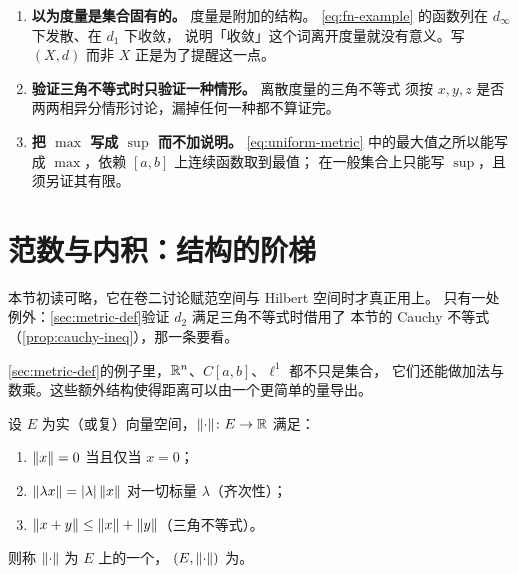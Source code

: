 \begin{pitfall}
  \begin{enumerate}[label=(\arabic*), leftmargin=1.6em]
    \item \textbf{以为度量是集合固有的。} 度量是附加的结构。
          \cref{eq:fn-example} 的函数列在 \(d_{\infty}\) 下发散、在 \(d_{1}\) 下收敛，
          说明「收敛」这个词离开度量就没有意义。写 \((X,d)\) 而非 \(X\)
          正是为了提醒这一点。
    \item \textbf{验证三角不等式时只验证一种情形。} 离散度量的三角不等式
          须按 \(x,y,z\) 是否两两相异分情形讨论，漏掉任何一种都不算证完。
    \item \textbf{把 \(\max\) 写成 \(\sup\) 而不加说明。} \cref{eq:uniform-metric}
          中的最大值之所以能写成 \(\max\)，依赖 \([a,b]\) 上连续函数取到最值；
          在一般集合上只能写 \(\sup\)，且须另证其有限。
  \end{enumerate}
\end{pitfall}

\section[范数与内积：结构的阶梯〔选读〕]{范数与内积：结构的阶梯\optread}
\label{sec:norm}

本节初读可略，它在卷二讨论赋范空间与 Hilbert 空间时才真正用上。
只有一处例外：\cref{sec:metric-def}验证 \(d_{2}\) 满足三角不等式时借用了
本节的 Cauchy 不等式（\cref{prop:cauchy-ineq}），那一条要看。

\cref{sec:metric-def}的例子里，\(\mathbb{R}^{n}\)、\(C[a,b]\)、\(\ell^{1}\) 都不只是集合，
它们还能做加法与数乘。这些额外结构使得距离可以由一个更简单的量导出。

\begin{definition}[范数]
  \label{def:norm}
  设 \(E\) 为实（或复）向量空间，\(\lVert\cdot\rVert \colon E \to \mathbb{R}\) 满足：
  \begin{enumerate}[label=(N\arabic*)]
    \item \(\lVert x\rVert = 0\) 当且仅当 \(x = 0\)；
    \item \(\lVert\lambda x\rVert = \lvert\lambda\rvert\,\lVert x\rVert\) 对一切标量 \(\lambda\)（齐次性）；
    \item \(\lVert x+y\rVert \le \lVert x\rVert + \lVert y\rVert\)（三角不等式）。
  \end{enumerate}
  则称 \(\lVert\cdot\rVert\) 为 \(E\) 上的一个，
  \((E, \lVert\cdot\rVert)\) 为。
\end{definition}

